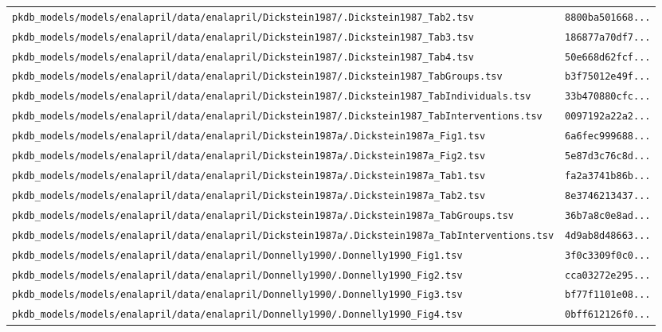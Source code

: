 \begin{longtable}{ll}
\texttt{pkdb\_models/models/enalapril/data/enalapril/Dickstein1987/.Dickstein1987\_Tab2.tsv} & \texttt{8800ba501668...} \\
\texttt{pkdb\_models/models/enalapril/data/enalapril/Dickstein1987/.Dickstein1987\_Tab3.tsv} & \texttt{186877a70df7...} \\
\texttt{pkdb\_models/models/enalapril/data/enalapril/Dickstein1987/.Dickstein1987\_Tab4.tsv} & \texttt{50e668d62fcf...} \\
\texttt{pkdb\_models/models/enalapril/data/enalapril/Dickstein1987/.Dickstein1987\_TabGroups.tsv} & \texttt{b3f75012e49f...} \\
\texttt{pkdb\_models/models/enalapril/data/enalapril/Dickstein1987/.Dickstein1987\_TabIndividuals.tsv} & \texttt{33b470880cfc...} \\
\texttt{pkdb\_models/models/enalapril/data/enalapril/Dickstein1987/.Dickstein1987\_TabInterventions.tsv} & \texttt{0097192a22a2...} \\
\texttt{pkdb\_models/models/enalapril/data/enalapril/Dickstein1987a/.Dickstein1987a\_Fig1.tsv} & \texttt{6a6fec999688...} \\
\texttt{pkdb\_models/models/enalapril/data/enalapril/Dickstein1987a/.Dickstein1987a\_Fig2.tsv} & \texttt{5e87d3c76c8d...} \\
\texttt{pkdb\_models/models/enalapril/data/enalapril/Dickstein1987a/.Dickstein1987a\_Tab1.tsv} & \texttt{fa2a3741b86b...} \\
\texttt{pkdb\_models/models/enalapril/data/enalapril/Dickstein1987a/.Dickstein1987a\_Tab2.tsv} & \texttt{8e3746213437...} \\
\texttt{pkdb\_models/models/enalapril/data/enalapril/Dickstein1987a/.Dickstein1987a\_TabGroups.tsv} & \texttt{36b7a8c0e8ad...} \\
\texttt{pkdb\_models/models/enalapril/data/enalapril/Dickstein1987a/.Dickstein1987a\_TabInterventions.tsv} & \texttt{4d9ab8d48663...} \\
\texttt{pkdb\_models/models/enalapril/data/enalapril/Donnelly1990/.Donnelly1990\_Fig1.tsv} & \texttt{3f0c3309f0c0...} \\
\texttt{pkdb\_models/models/enalapril/data/enalapril/Donnelly1990/.Donnelly1990\_Fig2.tsv} & \texttt{cca03272e295...} \\
\texttt{pkdb\_models/models/enalapril/data/enalapril/Donnelly1990/.Donnelly1990\_Fig3.tsv} & \texttt{bf77f1101e08...} \\
\texttt{pkdb\_models/models/enalapril/data/enalapril/Donnelly1990/.Donnelly1990\_Fig4.tsv} & \texttt{0bff612126f0...} \\

\end{longtable}

